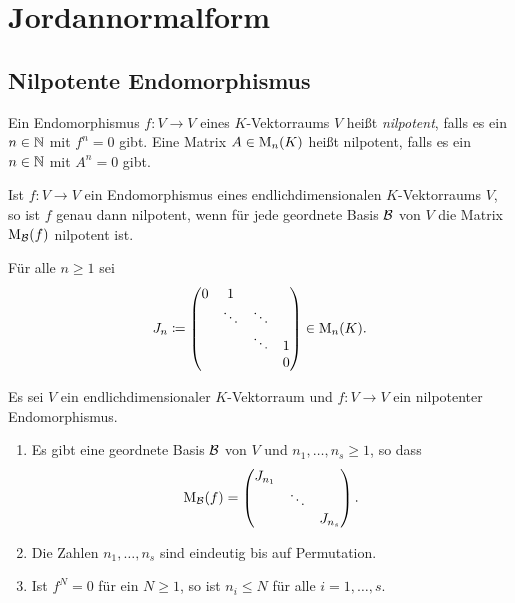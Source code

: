 \section{Jordannormalform}










\subsection{Nilpotente Endomorphismus}


\begin{definition}
  Ein Endomorphismus $f \colon V \to V$ eines $K$-Vektorraums $V$ heißt \emph{nilpotent}, falls es ein $n \in \mathbb{N}$ mit $f^n = 0$ gibt.
  Eine Matrix $A \in \mathrm{M}_n(K)$ heißt nilpotent, falls es ein $n \in \mathbb{N}$ mit $A^n = 0$ gibt.
\end{definition}


\begin{lemma}
  Ist $f \colon V \to V$ ein Endomorphismus eines endlichdimensionalen $K$-Vek\-tor\-raums $V$, so ist $f$ genau dann nilpotent, wenn für jede geordnete Basis $\mathcal{B}$ von $V$ die Matrix $\mathrm{M}_{\mathcal{B}}(f)$ nilpotent ist.
\end{lemma}


\begin{notation}
  Für alle $n \geq 1$ sei
  \[
    J_n
    \coloneqq
    \begin{pmatrix}
      0 & 1       &         &   \\
        & \ddots  & \ddots  &   \\
        &         & \ddots  & 1 \\
        &         &         & 0
    \end{pmatrix}
    \in \mathrm{M}_n(K).
  \]
\end{notation}


\begin{theorem}
  Es sei $V$ ein endlichdimensionaler $K$-Vektorraum und $f \colon V \to V$ ein nilpotenter Endomorphismus.
  \begin{enumerate}[leftmargin=*, label=\roman*)]
    \item
      Es gibt eine geordnete Basis $\mathcal{B}$ von $V$ und $n_1, \dotsc, n_s \geq 1$, so dass
      \[
        \mathrm{M}_{\mathcal{B}}(f)
        =
        \begin{pmatrix}
          J_{n_1} &         &         \\
                  & \ddots  &         \\
                  &         & J_{n_s}
        \end{pmatrix}.
      \]
    \item
      Die Zahlen $n_1, \dotsc, n_s$ sind eindeutig bis auf Permutation.
    \item
      Ist $f^N = 0$ für ein $N \geq 1$, so ist $n_i \leq N$ für alle $i = 1, \dotsc, s$.
  \end{enumerate}
\end{theorem}


